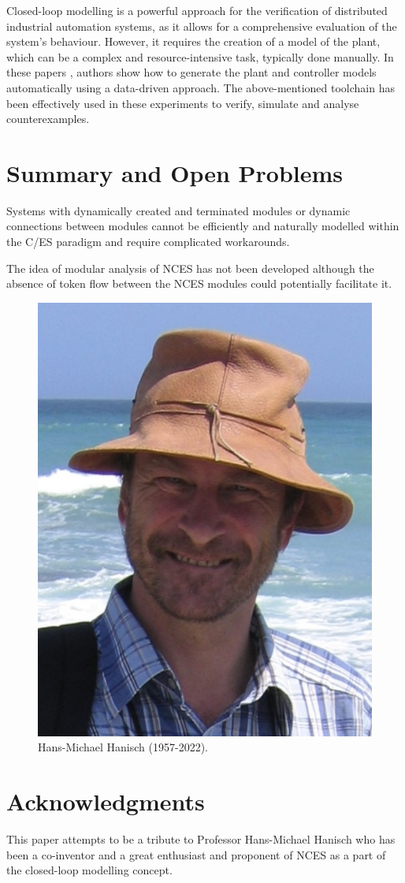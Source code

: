 \documentclass[runningheads]{llncs}
\begin{document}
Closed-loop modelling is a powerful approach for the verification of distributed industrial automation systems, as it allows for a comprehensive evaluation of the system's behaviour. However, it requires the creation of a model of the plant, which can be a complex and resource-intensive task, typically done manually. In these papers \cite{xavier2021plant,xavier2022process,xavier2022interactive,xavier2022plant}, authors show how to generate the plant and controller models automatically using a data-driven approach. The above-mentioned toolchain has been effectively used in these experiments to verify, simulate and analyse counterexamples. 


\section{Summary and Open Problems}\label{sec:summary}


Systems with dynamically created and terminated modules or dynamic connections between modules cannot be efficiently and naturally modelled within the C/ES paradigm and require complicated workarounds.

The idea of modular analysis of NCES has not been developed although the absence of token flow between the NCES modules could potentially facilitate it.

\begin {figure}
    \centering
    \includegraphics [width = .35 \textwidth] {images/Hanisch.jpg}
    \caption {Hans-Michael Hanisch (1957-2022).}
    \label {fig:Hanisch}
\end {figure}


\section*{Acknowledgments}
This paper attempts to be a tribute to Professor Hans-Michael Hanisch who has been a co-inventor and a great enthusiast and proponent of NCES as a part of the closed-loop modelling concept. 
 
\end{document}
